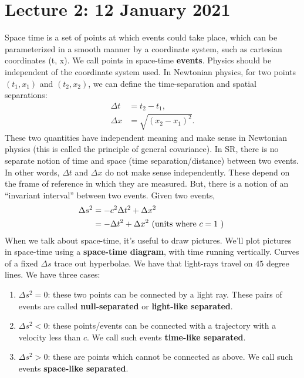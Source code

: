 \documentclass[11pt]{article}
\theoremstyle{definition}
\begin{document}
\section{Lecture 2: 12 January 2021} 
Space time is a set of points at which events could take place, which can be parameterized in a smooth manner by a coordinate system, such as cartesian coordinates (t, x). We call points in space-time \textbf{events}. Physics should be independent of the coordinate system used. 
\newline 
\newline 
In Newtonian physics, for two points \( (t_1, x_1) \) and \( (t_2, x_2) \), we can define the time-separation and spatial separations:
\begin{align*}
	\Delta t & = t_2 - t_1, \\
	\Delta x & = \sqrt{(x_2-x_1)^2}.
\end{align*}
These two quantities have independent meaning and make sense in Newtonian physics (this is called the principle of general covariance). In SR, there is no separate notion of time and space (time separation/distance) between two events. In other words, \( \Delta t \) and \( \Delta x \) do not make sense independently. These depend on the frame of reference in which they are measured. But, there is a notion of an ``invariant interval'' between two events. Given two events, 
\begin{align*}
	\Delta s^2 & = -c^2 \Delta t^2 + \Delta x^2 \\
			& = - \Delta t^2 + \Delta x^2 \text{ (units where \( c = 1 \) ) }
\end{align*}
When we talk about space-time, it's useful to draw pictures. We'll plot pictures in space-time using a \textbf{space-time diagram}, with time running vertically. Curves of a fixed \( \Delta s \) trace out hyperbolae. We have that light-rays travel on \( 45 \) degree lines. We have three cases: 
\begin{enumerate}[noitemsep]
	\item \( \Delta s^2 = 0 \): these two points can be connected by a light ray. These pairs of events are called \textbf{null-separated} or \textbf{light-like separated}. 
	\item \( \Delta s^2 < 0 \): these points/events can be connected with a trajectory with a velocity less than \( c \). We call such events \textbf{time-like separated}. 
	\item \( \Delta s^2 > 0 \): these are points which cannot be connected as above. We call such events \textbf{space-like separated}.
\end{enumerate}
\end{document}
